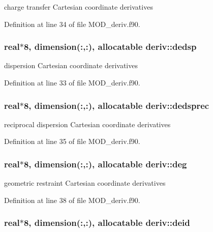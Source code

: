 charge transfer Cartesian coordinate derivatives 



Definition at line 34 of file M\-O\-D\-\_\-deriv.\-f90.

\hypertarget{classderiv_a16062b367c27ed1b00bd4fe6900797ea}{
\subsubsection[{dedsp}]{\setlength{\rightskip}{0pt plus 5cm}real$\ast$8, dimension(\-:,\-:), allocatable deriv\-::dedsp}}\label{classderiv_a16062b367c27ed1b00bd4fe6900797ea}


dispersion Cartesian coordinate derivatives 



Definition at line 33 of file M\-O\-D\-\_\-deriv.\-f90.

\hypertarget{classderiv_a6ed62d8cabbb1cf18f30cf10c6aa287c}{
\subsubsection[{dedsprec}]{\setlength{\rightskip}{0pt plus 5cm}real$\ast$8, dimension(\-:,\-:), allocatable deriv\-::dedsprec}}\label{classderiv_a6ed62d8cabbb1cf18f30cf10c6aa287c}


reciprocal dispersion Cartesian coordinate derivatives 



Definition at line 35 of file M\-O\-D\-\_\-deriv.\-f90.

\hypertarget{classderiv_a48f5d63eb5bf79b3cc10e774b18bf06b}{
\subsubsection[{deg}]{\setlength{\rightskip}{0pt plus 5cm}real$\ast$8, dimension(\-:,\-:), allocatable deriv\-::deg}}\label{classderiv_a48f5d63eb5bf79b3cc10e774b18bf06b}


geometric restraint Cartesian coordinate derivatives 



Definition at line 38 of file M\-O\-D\-\_\-deriv.\-f90.

\hypertarget{classderiv_ab0687390c082d71e1256dee35ba0e02d}{
\subsubsection[{deid}]{\setlength{\rightskip}{0pt plus 5cm}real$\ast$8, dimension(\-:,\-:), allocatable deriv\-::deid}}\label{classderiv_ab0687390c082d71e1256dee35ba0e02d}


